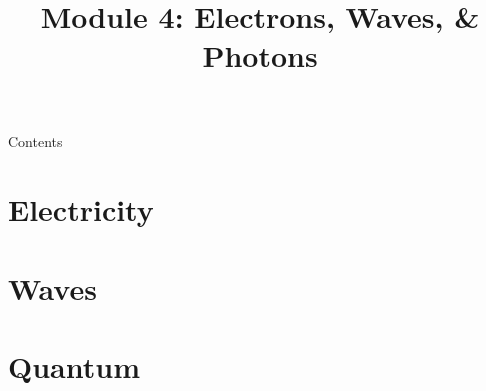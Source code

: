 \documentclass[10pt,compress]{beamer}
\begin{document}
\title{Module 4: Electrons, Waves, \& Photons}
\author{}
\date{}

\begin{frame} %
\titlepage
\end{frame}

\begin{frame}{Contents}
    \tableofcontents[part=1]
\end{frame}

\part{Electricity}








\part{Waves}











\part{Quantum}




\end{document}
